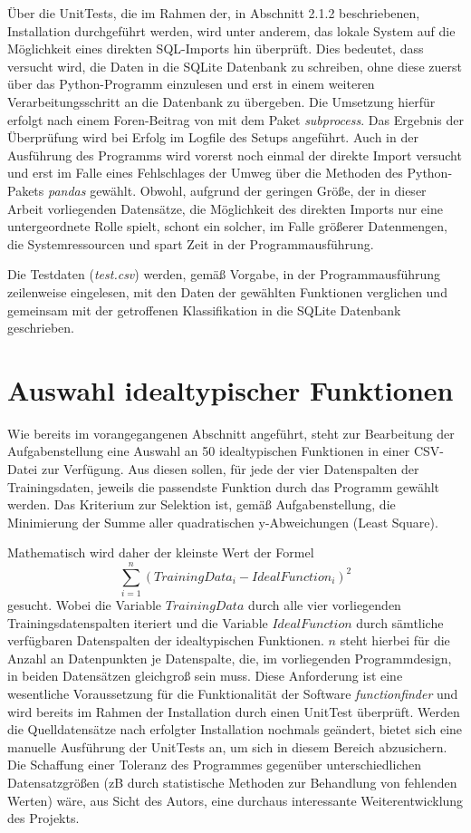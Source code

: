 Über die UnitTests, die im Rahmen der, in Abschnitt 2.1.2 beschriebenen, Installation durchgeführt werden, wird unter anderem, das lokale System auf die Möglichkeit eines direkten SQL-Imports hin überprüft. Dies bedeutet, dass versucht wird, die Daten in die SQLite Datenbank zu schreiben, ohne diese zuerst über das Python-Programm einzulesen und erst in einem weiteren Verarbeitungsschritt an die Datenbank zu übergeben. Die Umsetzung hierfür erfolgt nach einem Foren-Beitrag von \cite{stevens-haas_importing_2021} mit dem Paket \emph{subprocess}. Das Ergebnis der Überprüfung wird bei Erfolg im Logfile des Setups angeführt. Auch in der Ausführung des Programms wird vorerst noch einmal der direkte Import versucht und erst im Falle eines Fehlschlages der Umweg über die Methoden des Python-Pakets \emph{pandas} gewählt. Obwohl, aufgrund der geringen Größe, der in dieser Arbeit vorliegenden Datensätze, die Möglichkeit des direkten Imports nur eine untergeordnete Rolle spielt, schont ein solcher, im Falle größerer Datenmengen, die Systemressourcen und spart Zeit in der Programmausführung.

Die Testdaten (\emph{test.csv}) werden, gemäß Vorgabe, in der Programmausführung zeilenweise eingelesen, mit den Daten der gewählten Funktionen verglichen und gemeinsam mit der getroffenen Klassifikation in die SQLite Datenbank geschrieben.


\section{Auswahl idealtypischer Funktionen}

Wie bereits im vorangegangenen Abschnitt angeführt, steht zur Bearbeitung der Aufgabenstellung eine Auswahl an 50 idealtypischen Funktionen in einer CSV-Datei zur Verfügung. Aus diesen sollen, für jede der vier Datenspalten der Trainingsdaten, jeweils die passendste Funktion durch das Programm gewählt werden. Das Kriterium zur Selektion ist, gemäß Aufgabenstellung, die Minimierung der Summe aller quadratischen y-Abweichungen (Least Square).

Mathematisch wird daher der kleinste Wert der Formel
\begin{equation}  
\sum_{i=1}^{n}(TrainingData_{i} - IdealFunction_{i})^2
\label{leastsquare}
\end{equation}
gesucht. Wobei die Variable $TrainingData$ durch alle vier vorliegenden Trainingsdatenspalten iteriert und die Variable $IdealFunction$ durch sämtliche verfügbaren Datenspalten der idealtypischen Funktionen. $n$ steht hierbei für die Anzahl an Datenpunkten je Datenspalte, die, im vorliegenden Programmdesign, in beiden Datensätzen gleichgroß sein muss. Diese Anforderung ist eine wesentliche Voraussetzung für die Funktionalität der Software \emph{functionfinder} und wird bereits im Rahmen der Installation durch einen UnitTest überprüft. Werden die Quelldatensätze nach erfolgter Installation nochmals geändert, bietet sich eine manuelle Ausführung der UnitTests an, um sich in diesem Bereich abzusichern. Die Schaffung einer Toleranz des Programmes gegenüber unterschiedlichen Datensatzgrößen (zB durch statistische Methoden zur Behandlung von fehlenden Werten) wäre, aus Sicht des Autors, eine durchaus interessante Weiterentwicklung des Projekts.

